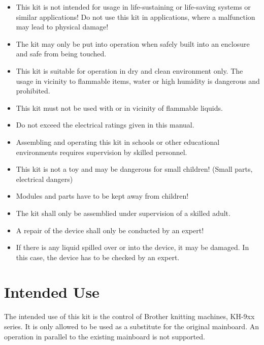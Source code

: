 \documentclass[fleqn,10pt]{SelfArx} %
\begin{document}
\begin{itemize}[noitemsep] %
\item This kit is not intended for usage in life-sustaining or life-saving systems or similar applications! Do not use this kit in applications, where a malfunction may lead to physical damage!
\item The kit may only be put into operation when safely built into an enclosure and safe from being touched.
\item This kit is suitable for operation in dry and clean environment only. The usage in vicinity to flammable items, water or high humidity is dangerous and prohibited.
\item This kit must not be used with or in vicinity of flammable liquids.
\item Do not exceed the electrical ratings given in this manual.
\item Assembling and operating this kit in schools or other educational environments requires supervision by skilled personnel.
\item This kit is not a toy and may be dangerous for small children! (Small parts, electrical dangers)
\item Modules and parts have to be kept away from children!
\item The kit shall only be assemblied under supervision of a skilled adult.
\item A repair of the device shall only be conducted by an expert!
\item If there is any liquid spilled over or into the device, it may be damaged. In this case, the device has to be checked by an expert.

\end{itemize}


\section{Intended Use}

The intended use of this kit is the control of Brother knitting machines, KH-9xx series.
It is only allowed to be used as a substitute for the original mainboard. An operation in parallel to the existing mainboard is not supported.
\end{document}
